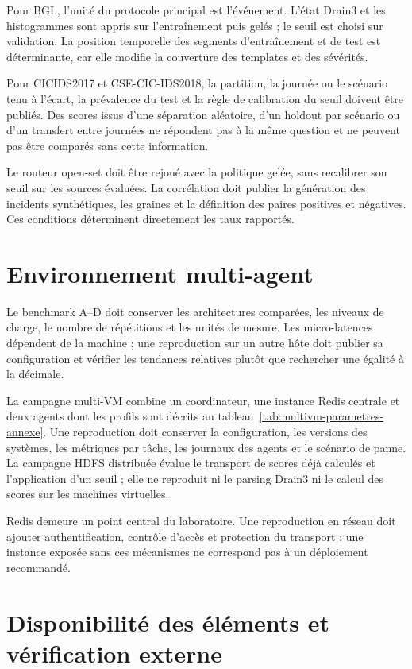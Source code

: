 Pour BGL, l'unité du protocole principal est l'événement. L'état Drain3 et les histogrammes
sont appris sur l'entraînement puis gelés ; le seuil est choisi sur validation. La position
temporelle des segments d'entraînement et de test est déterminante, car elle modifie la
couverture des templates et des sévérités.

Pour CICIDS2017 et CSE-CIC-IDS2018, la partition, la journée ou le scénario tenu à l'écart,
la prévalence du test et la règle de calibration du seuil doivent être publiés. Des scores
issus d'une séparation aléatoire, d'un holdout par scénario ou d'un transfert entre journées
ne répondent pas à la même question et ne peuvent pas être comparés sans cette information.

Le routeur open-set doit être rejoué avec la politique gelée, sans recalibrer son seuil sur
les sources évaluées. La corrélation doit publier la génération des incidents synthétiques,
les graines et la définition des paires positives et négatives. Ces conditions déterminent
directement les taux rapportés.

\section{Environnement multi-agent}

Le benchmark A--D doit conserver les architectures comparées, les niveaux de charge, le
nombre de répétitions et les unités de mesure. Les micro-latences dépendent de la machine ;
une reproduction sur un autre hôte doit publier sa configuration et vérifier les tendances
relatives plutôt que rechercher une égalité à la décimale.

La campagne multi-VM combine un coordinateur, une instance Redis centrale et deux agents
dont les profils sont décrits au tableau~\ref{tab:multivm-parametres-annexe}. Une
reproduction doit conserver la configuration, les versions des systèmes, les métriques par
tâche, les journaux des agents et le scénario de panne. La campagne HDFS distribuée évalue
le transport de scores déjà calculés et l'application d'un seuil ; elle ne reproduit ni le
parsing Drain3 ni le calcul des scores sur les machines virtuelles.

Redis demeure un point central du laboratoire. Une reproduction en réseau doit ajouter
authentification, contrôle d'accès et protection du transport ; une instance exposée sans
ces mécanismes ne correspond pas à un déploiement recommandé.

\section{Disponibilité des éléments et vérification externe}

